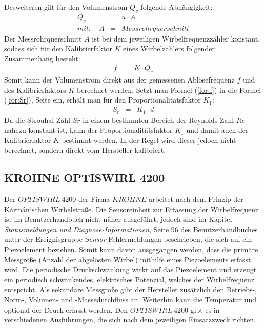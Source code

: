 Desweiteren gilt für den Volumenstrom $Q_v$ folgende Abhängigkeit:
\begin{eqnarray}
    Q_v &=& u \cdot A \\
    mit: \quad A &=& Messrohrquerschnitt \nonumber
\end{eqnarray}
Der Messrohrquerschnitt $A$ ist bei dem jeweiligen Wirbelfrequenzzähler konstant, sodass sich für den Kalibrierfaktor $K$ eines Wirbelzählers folgender Zusammenhang besteht:
\begin{eqnarray}
    f &=& K \cdot Q_v
\end{eqnarray}
Somit kann der Volumenstrom direkt aus der gemessenen Ablösefrequenz $f$ und des Kalibrierfaktors $K$ berechnet werden. Setzt man Formel (\ref{for:f}) in die Formel (\ref{for:Sr}), Seite \pageref{for:Sr} ein, erhält man für den Proportionalitätsfaktor $K_1$:
\begin{eqnarray}
    S_r &=& K_1 \cdot d
\end{eqnarray}
Da die Strouhal-Zahl $Sr$ in einem bestimmten Bereich der Reynolds-Zahl $Re$ nahezu konstant ist, kann der Proportionalitätsfaktor $K_1$ und damit auch der Kalibrierfaktor $K$ bestimmt werden. In der Regel wird dieser jedoch nicht berechnet, sondern direkt vom Hersteller kalibriert.\autocite[vgl.][S. 806 \psq]{Sensortechnik}

\subsection{KROHNE OPTISWIRL 4200}
Der $OPTISWIRL \: 4200$ der Firma  $KROHNE$ arbeitet nach dem Prinzip der K\'{a}rm\'{a}n`schen Wirbelstraße. Die Sensoreinheit zur Erfassung der Wirbelfrequenz ist im Benutzerhandbuch nicht näher ausgeführt, jedoch sind im Kapitel \textit{\glqq Statusmeldungen und Diagnose-Informationen\grqq{}}, Seite 96 des Benutzerhandbuches unter der Ereignisgruppe \textit{\glqq Sensor\grqq{}} Fehlermeldungen beschrieben, die sich auf ein Piezoelement beziehen. Somit kann davon ausgegangen werden, dass die primäre Messgröße (Anzahl der abgelösten Wirbel) mithilfe eines Piezoelements erfasst wird. Die periodische Druckschwankung wirkt auf das Piezoelement und erzeugt ein periodisch schwankendes, elektrisches Potenzial, welches der Wirbelfrequenz entspricht. Als sekundäre Messgröße gibt der Hersteller zusätzlich den Betriebs-, Norm-, Volumen- und -Massedurchfluss an. Weiterhin kann die Temperatur und optional der Druck erfasst werden. Den $OPTISWIRL \: 4200$ gibt es in verschiedenen Ausführungen, die sich nach dem jeweiligen Einsatzzweck richten. \autocite[vgl.][96, 107 \psq]{Optiswirl}

